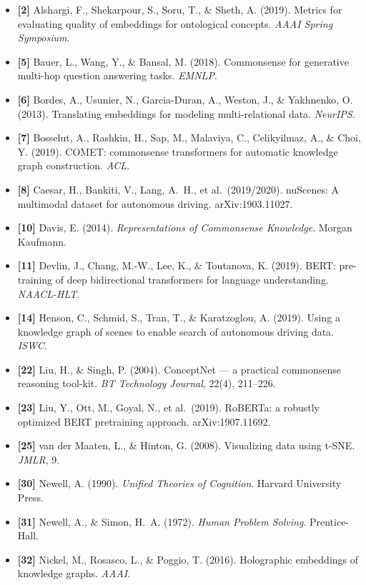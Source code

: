 \documentclass[11pt, a4paper]{article}
\begin{document}
\begin{itemize}[itemsep=0.1em, leftmargin=*]
  \item \textbf{[2]} Alshargi, F., Shekarpour, S., Soru, T., \& Sheth, A. (2019). Metrics for evaluating quality of embeddings for ontological concepts. \emph{AAAI Spring Symposium}.
  \item \textbf{[5]} Bauer, L., Wang, Y., \& Bansal, M. (2018). Commonsense for generative multi-hop question answering tasks. \emph{EMNLP}.
  \item \textbf{[6]} Bordes, A., Usunier, N., Garcia-Duran, A., Weston, J., \& Yakhnenko, O. (2013). Translating embeddings for modeling multi-relational data. \emph{NeurIPS}.
  \item \textbf{[7]} Bosselut, A., Rashkin, H., Sap, M., Malaviya, C., Celikyilmaz, A., \& Choi, Y. (2019). COMET: commonsense transformers for automatic knowledge graph construction. \emph{ACL}.
  \item \textbf{[8]} Caesar, H., Bankiti, V., Lang, A.\ H., et al.\ (2019/2020). nuScenes: A multimodal dataset for autonomous driving. arXiv:1903.11027.
  \item \textbf{[10]} Davis, E. (2014). \emph{Representations of Commonsense Knowledge}. Morgan Kaufmann.
  \item \textbf{[11]} Devlin, J., Chang, M.-W., Lee, K., \& Toutanova, K. (2019). BERT: pre-training of deep bidirectional transformers for language understanding. \emph{NAACL-HLT}.
  \item \textbf{[14]} Henson, C., Schmid, S., Tran, T., \& Karatzoglou, A. (2019). Using a knowledge graph of scenes to enable search of autonomous driving data. \emph{ISWC}.
  \item \textbf{[22]} Liu, H., \& Singh, P. (2004). ConceptNet — a practical commonsense reasoning tool-kit. \emph{BT Technology Journal}, 22(4), 211--226.
  \item \textbf{[23]} Liu, Y., Ott, M., Goyal, N., et al.\ (2019). RoBERTa: a robustly optimized BERT pretraining approach. arXiv:1907.11692.
  \item \textbf{[25]} van der Maaten, L., \& Hinton, G. (2008). Visualizing data using t-SNE. \emph{JMLR}, 9.
  \item \textbf{[30]} Newell, A. (1990). \emph{Unified Theories of Cognition}. Harvard University Press.
  \item \textbf{[31]} Newell, A., \& Simon, H.\ A. (1972). \emph{Human Problem Solving}. Prentice-Hall.
  \item \textbf{[32]} Nickel, M., Rosasco, L., \& Poggio, T. (2016). Holographic embeddings of knowledge graphs. \emph{AAAI}.

\end{itemize}
\end{document}
